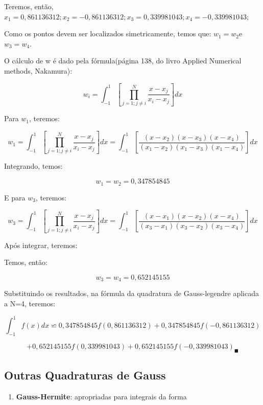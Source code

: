 \begin{enumerate}
\begin{example}
Teremos, então, $x_{1}=0,861136312;x_{2}=-0,861136312;x_{3}=0,339981043;x_{4}=-0,339981043;$


Como os pontos devem ser localizados simetricamente, temos que: $w_{1}=w_{2}$e$w_{3}=w_{4}.$

O cálculo de w é dado pela fórmula(página 138, do livro Applied Numerical
methods, Nakamura):

\[
w_{i}=\int_{-1}^{1}\left[\prod_{{\scriptscriptstyle j=1;j\neq i}}^{{\scriptscriptstyle N}}{\scriptstyle \frac{{\scriptstyle x-x_{j}}}{x_{i}-x_{j}}}\right]dx\]


Para $w_{1}$, teremos:

\[
w_{1}=\int_{-1}^{1}\left[\prod_{{\scriptscriptstyle j=1;j\neq i}}^{{\scriptscriptstyle N}}{\scriptstyle \frac{{\scriptstyle x-x_{j}}}{x_{i}-x_{j}}}\right]dx=\int_{-1}^{1}\left[\frac{(x-x_{2})(x-x_{3})(x-x_{4})}{(x_{1}-x_{2})(x_{1}-x_{3})(x_{1}-x_{4})}\right]dx\]


Integrando, temos:

\[
w_{1}=w_{2}=0,347854845\]


E para $w_{3}$, teremos:

\[
w_{3}=\int_{-1}^{1}\left[\prod_{{\scriptscriptstyle j=1;j\neq i}}^{{\scriptscriptstyle N}}{\scriptstyle \frac{{\scriptstyle x-x_{j}}}{x_{i}-x_{j}}}\right]dx=\int_{-1}^{1}\left[\frac{(x-x_{1})(x-x_{2})(x-x_{4})}{(x_{3}-x_{1})(x_{3}-x_{2})(x_{3}-x_{4})}\right]dx\]


Após integrar, teremos:

Temos, então:

\[
w_{3}=w_{4}=0,652145155\]


Substituindo os resultados, na fórmula da quadratura de Gauss-legendre
aplicada a N=4, teremos:

\[
\int_{-1}^{1}{\scriptstyle f(x)dx}\backsimeq0,347854845f(0,861136312)+0,347854845f(-0,861136312)\]


\[
+0,652145155f(0,339981043)+0,652145155f(-0,339981043)_{\blacksquare}\]
\end{example}


\subsection{Outras Quadraturas de Gauss}

\begin{enumerate}

\item 
\textbf{Gauss-Hermite}: apropriadas para integrais da forma


\end{enumerate}
\end{enumerate}
